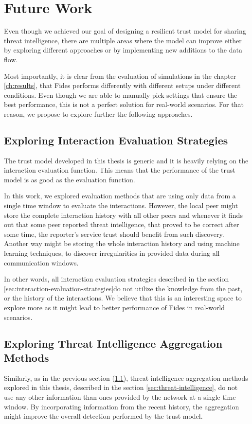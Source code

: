 \section{Future Work}
\label{sec:future-work}
Even though we achieved our goal of designing a resilient trust model for sharing threat intelligence, there are multiple areas where the model can improve either by exploring different approaches or by implementing new additions to the data flow.

Most importantly, it is clear from the evaluation of simulations in the chapter \ref{ch:results}, that Fides performs differently with different setups under different conditions.
Even though we are able to manually pick settings that ensure the best performance, this is not a perfect solution for real-world scenarios.
For that reason, we propose to explore further the following approaches.

\subsection{Exploring Interaction Evaluation Strategies}
\label{subsec:exploring-interaction-eval-strategies}
The trust model developed in this thesis is generic and it is heavily relying on the interaction evaluation function.
This means that the performance of the trust model is as good as the evaluation function.

In this work, we explored evaluation methods that are using only data from a single time window to evaluate the interactions.
However, the local peer might store the complete interaction history with all other peers and whenever it finds out that some peer reported threat intelligence, that proved to be correct after some time, the reporter's service trust should benefit from such discovery.
Another way might be storing the whole interaction history and using machine learning techniques, to discover irregularities in provided data during all communication windows.

In other words, all interaction evaluation strategies described in the section \ref{sec:interaction-evaluation-strategies}do not utilize the knowledge from the past, or the history of the interactions.
We believe that this is an interesting space to explore more as it might lead to better performance of Fides in real-world scenarios.

\subsection{Exploring Threat Intelligence Aggregation Methods}
\label{subsec:exploring-threat-intelligence-aggregation-methods}
Similarly, as in the previous section (\ref{subsec:exploring-interaction-eval-strategies}), threat intelligence aggregation methods explored in this thesis, described in the section \ref{sec:threat-intelligence}, do not use any other information than ones provided by the network at a single time window.
By incorporating information from the recent history, the aggregation might improve the overall detection performed by the trust model.

